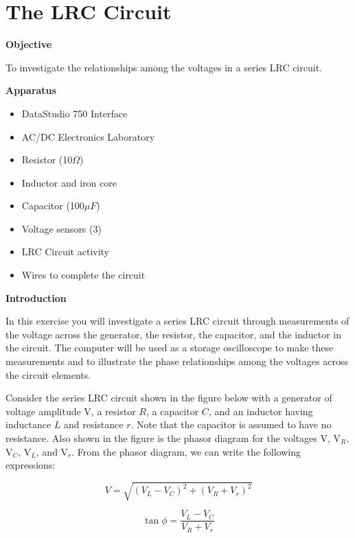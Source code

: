 
\section{The LRC Circuit}

\makelabheader %

\textbf{Objective}

To investigate the relationships among the voltages in a series LRC
circuit.

\textbf{Apparatus} 

\begin{itemize}
\item DataStudio 750 Interface
\item AC/DC Electronics Laboratory
\item Resistor (10$\Omega$)
\item Inductor and iron core 
\item Capacitor (100$\mu F$)
\item Voltage sensors (3)
\item LRC Circuit activity
\item Wires to complete the circuit
\end{itemize}
\textbf{Introduction} 

In this exercise you will investigate a series LRC circuit through
measurements of the voltage across the generator, the resistor, the
capacitor, and the inductor in the circuit. The computer will be used
as a storage oscilloscope to make these measurements and to illustrate
the phase relationships among the voltages across the circuit elements.

Consider the series LRC circuit shown in the figure below with a generator
of voltage amplitude V, a resistor $R$, a capacitor $C$, and an inductor
having inductance $L$ and resistance $r$. Note that the capacitor is assumed
to have no resistance. Also shown in the figure is the phasor diagram
for the voltages V, V\( _{R} \), V\( _{C} \), V\( _{L} \), and
V\( _{r} \). From the phasor diagram, we can write the following
expressions:

\[
V=\sqrt{(V_{L}-V_{C})^{2}+(V_{R}+V_{r})^{2}}\]


\[
\tan \phi =\frac{V_{L}-V_{C}}{V_{R}+V_{r}}\]


\vspace{0.3cm}
{\centering {} \par}
\vspace{0.3cm}

